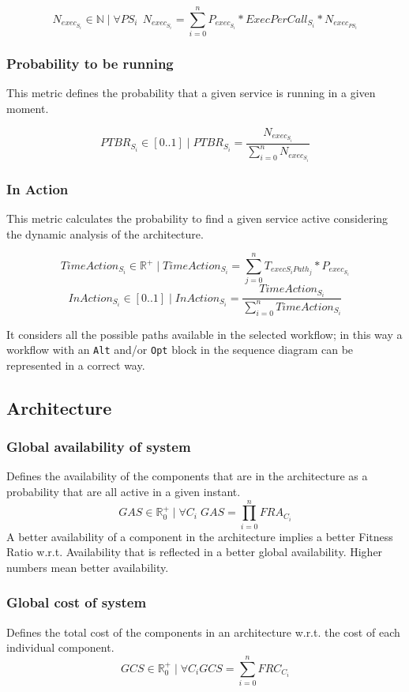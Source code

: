 \[ N_{exec_{S_i}} \in \mathbb{N} \; | \; \forall PS_i \;\, N_{exec_{S_i}} = \sum_{i=0}^{n} P_{exec_{S_i}} * ExecPerCall_{S_i} * N_{exec_{PS_i}} \]

\subsubsection{Probability to be running}
This metric defines the probability that a given service is running in a given moment.

\[ PTBR_{S_i} \in [0..1] \; | \; PTBR_{S_i} =  \frac{{N_{exec_{S_i}}}}{ \sum_{i=0}^{n}  N_{exec_{S_i}}} \]

\subsubsection{In Action}
This metric calculates the probability to find a given service active considering the dynamic analysis of the architecture.

\[ TimeAction_{S_i} \in \mathbb{R}^+ \; | \; TimeAction_{S_i}=\sum_{j=0}^{n} T_{exec{S_i}Path_j} * P_{exec_{S_i}} \]
\[ InAction_{S_i} \in [0..1] \; | \; InAction_{S_i} = \frac{TimeAction_{S_i}}{{\sum_{i=0}^n}TimeAction_{S_i}} \]

It considers all the possible paths available in the selected workflow; in this way a workflow with an \texttt{Alt} and/or \texttt{Opt} block in the sequence diagram can be represented in a correct way.

\subsection{Architecture}
\subsubsection{Global availability of system}
Defines the availability of the components that are in the architecture as a probability that are all active in a given instant.
\[ GAS \in \mathbb{R}^+_0 \; | \; \forall C_i \; GAS = \prod_{i=0}^{n} FRA_{C_i} \]
A better availability of a component in the architecture implies a better Fitness Ratio w.r.t. Availability that is reflected in a better global availability. Higher numbers mean better availability.
\subsubsection{Global cost of system}
Defines the total cost of the components in an architecture w.r.t. the cost of each individual component.
\[ GCS \in \mathbb{R}^+_0 \; | \; \forall C_i GCS = \sum_{i=0}^{n} FRC_{C_i} \]
